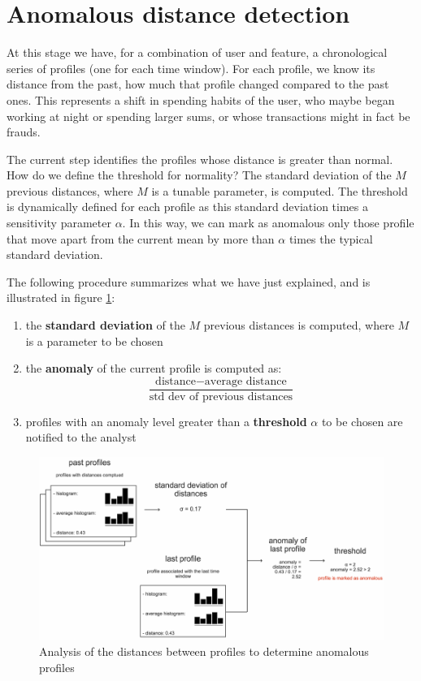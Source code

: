 \section{Anomalous distance detection}

At this stage we have, for a combination of user and feature, a chronological series of profiles (one for each time window). For each profile, we know its distance from the past, how much that profile changed compared to the past ones. This represents a shift in spending habits of the user, who maybe began working at night or spending larger sums, or whose transactions might in fact be frauds.

The current step identifies the profiles whose distance is greater than normal. How do we define the threshold for normality? The standard deviation of the $M$ previous distances, where $M$ is a tunable parameter, is computed. The threshold is dynamically defined for each profile as this standard deviation times a sensitivity parameter $\alpha$. In this way, we can mark as anomalous only those profile that move apart from the current mean by more than $\alpha$ times the typical standard deviation.

The following procedure summarizes what we have just explained, and is illustrated in figure \ref{fig:distance_analysis}:

\begin{enumerate}
  \item the \textbf{standard deviation} of the $M$ previous distances is computed, where $M$ is a parameter to be chosen
  \item the \textbf{anomaly} of the current profile is computed as:
    \begin{displaymath}
      \frac{\text{distance}-\text{average distance}}{\text{std dev of previous distances}}
    \end{displaymath}
  \item profiles with an anomaly level greater than a \textbf{threshold} $\alpha$ to be chosen are notified to the analyst
\end{enumerate}

\begin{figure}[h]
\centering
\includegraphics[width=450]{images/distance_analysis.pdf}
\caption{Analysis of the distances between profiles to determine anomalous profiles}
\label{fig:distance_analysis}
\end{figure}

